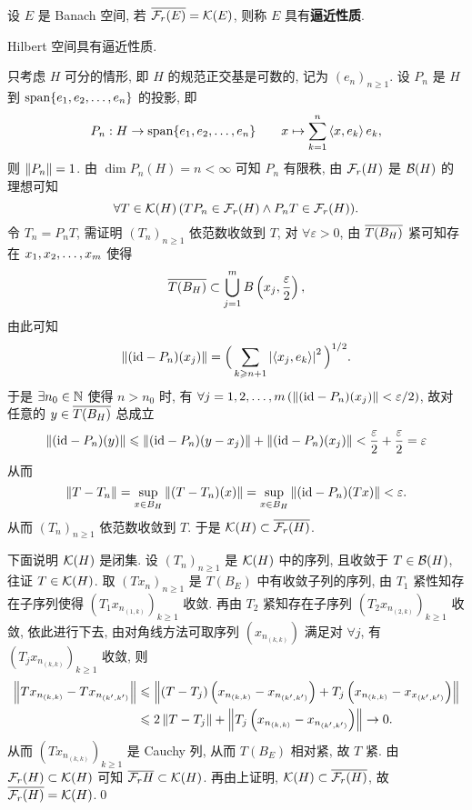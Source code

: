 	\begin{Definition}[逼近性质]\label{def:逼近性质}
		设 $ E $ 是 Banach 空间, 若 $ \baro{\Fr(E)}=\CK(E) $, 则称 $ E $ 具有\textbf{逼近性质}.
	\end{Definition}

	\begin{Theorem}
		Hilbert 空间具有逼近性质.
	\end{Theorem}
	\begin{Proof}
		只考虑 $ H $ 可分的情形, 即 $ H $ 的规范正交基是可数的, 记为 $ (e_{n})_{n\geqslant1} $. 设 $ P_{n} $ 是 $ H $ 到 $ \Span\{ \seq{e} \} $ 的投影, 即
		\[
			P_{n}: H\to\Span\{ \seq{e} \}\qquad x\mapsto \sum_{k=1}^{n}\lrangle{x, e_{k}}e_{k},
		\]
		则 $ \norm{P_{n}}=1 $. 由 $ \dim P_{n}(H)=n<\infty $ 可知 $ P_{n} $ 有限秩, 由 $ \Fr(H) $ 是 $ \CB(H) $ 的理想可知
		\[
			\forall T\in\CK(H)\,(TP_{n}\in\Fr(H)\land P_{n}T\in\Fr(H)).
		\]
		令 $ T_{n}=P_{n}T $, 需证明 $ (T_{n})_{n\geqslant1} $ 依范数收敛到 $ T $, 对 $ \forall\varepsilon>0 $, 由 $ \baro{T(B_{H})} $ 紧可知存在 $ \seq[m]{x} $ 使得
		\[
			\baro{T(B_{H})}\subset\bigcup_{j=1}^{m}B\left(x_{j}, \frac{\varepsilon}{2}\right),
		\]
		由此可知
		\[
			\norm{(\id -P_{n})(x_{j})}=\Big( \sum_{k\geqslant n+1} \abs{\lrangle{x_{j}, e_{k}}}^{2} \Big)^{1/2}.
		\]
		于是 $ \exists n_{0}\in\N $ 使得 $ n>n_{0} $ 时, 有 $ \forall j= 1, 2, \dots, m\,(\norm{(\id-P_{n})(x_{j})}<\varepsilon/2) $, 故对任意的 $ y\in\baro{T(B_{H})} $ 总成立
		\[
			\norm{(\id-P_{n})(y)}\leqslant\norm{(\id-P_{n})(y-x_{j})}+\norm{(\id-P_{n})(x_{j})}<\frac{\varepsilon}{2}+\frac{\varepsilon}{2}=\varepsilon
		\]
		从而
		\[
			\norm{T-T_{n}}=\sup_{x\in B_{H}}\norm{(T-T_{n})(x)}=\sup_{x\in B_{H}}\norm{(\id-P_{n})(Tx)}<\varepsilon.
		\]
		从而 $ (T_{n})_{n\geqslant1} $ 依范数收敛到 $ T $. 于是 $ \CK(H)\subset\baro{\Fr(H)} $.

		下面说明 $ \CK(H) $ 是闭集. 设 $ (T_{n})_{n\geqslant1} $ 是 $ \CK(H) $ 中的序列, 且收敛于 $ T\in\CB(H) $, 往证 $ T\in\CK(H) $. 取 $ (Tx_{n})_{n\geqslant1} $ 是 $ T(B_{E}) $ 中有收敛子列的序列, 由 $ T_{1} $ 紧性知存在子序列使得 $ \left(T_{1}x_{n_{(1, k)}}\right)_{k\geqslant1} $ 收敛. 再由 $ T_{2} $ 紧知存在子序列 $ \left(T_{2}x_{n_{(2, k)}}\right)_{k\geqslant1} $ 收敛, 依此进行下去, 由对角线方法可取序列 $ \left(x_{n_{(k, k)}}\right) $ 满足对 $ \forall j $, 有 $ \left(T_{j}x_{n_{(k, k)}}\right)_{k\geqslant1} $ 收敛, 则
		\[
			\begin{aligned}
				\norm{Tx_{n_{(k, k)}}-Tx_{n_{(k', k')}}} & \leqslant \norm{(T-T_{j})\left(x_{n_{(k, k)}}-x_{n_{(k', k')}}\right)+T_{j}\left(x_{n_{(k, k)}}-x_{x_{(k', k')}}\right)}\\
				& \leqslant 2\norm{T-T_{j}}+\norm{T_{j}\left(x_{n_{(k, k)}}-x_{n_{(k', k')}}\right)}\to 0.
			\end{aligned}
		\] 
		从而 $ \left( Tx_{n_{(k, k)}} \right)_{k\geqslant1} $ 是 Cauchy 列, 从而 $ T(B_{E}) $ 相对紧, 故 $ T $ 紧. 由 $ \Fr(H)\subset\CK(H) $ 可知 $ \baro{\Fr{H}}\subset \CK(H) $. 再由上证明, $ \CK(H)\subset\baro{\Fr(H)} $, 故 $ \baro{\Fr(H)}=\CK(H) $.\qed
	\end{Proof}

